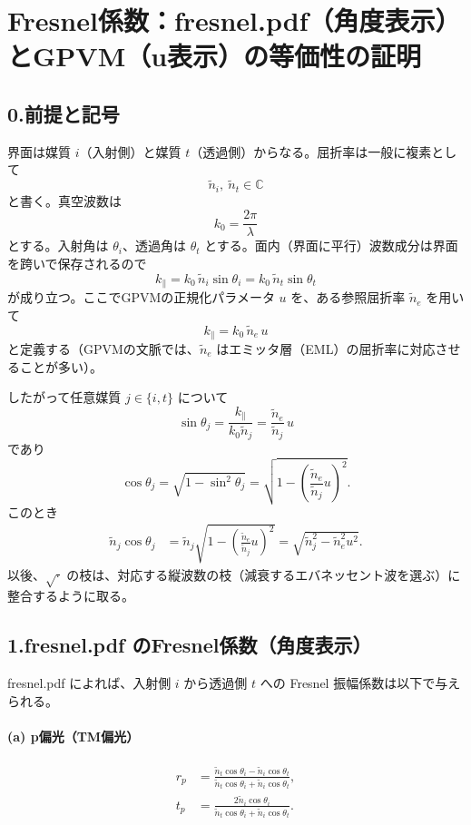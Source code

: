 
\section*{Fresnel係数：fresnel.pdf（角度表示）とGPVM（u表示）の等価性の証明}

\subsection*{0.\;前提と記号}
界面は媒質 $i$（入射側）と媒質 $t$（透過側）からなる。屈折率は一般に複素として
\[
\tilde n_i,\ \tilde n_t\in\mathbb{C}
\]
と書く。真空波数は
\[
k_0=\frac{2\pi}{\lambda}
\]
とする。入射角は $\theta_i$、透過角は $\theta_t$ とする。面内（界面に平行）波数成分は界面を跨いで保存されるので
\[
k_\parallel = k_0\,\tilde n_i \sin\theta_i = k_0\,\tilde n_t \sin\theta_t
\]
が成り立つ。ここでGPVMの正規化パラメータ $u$ を、ある参照屈折率 $\tilde n_e$ を用いて
\[
k_\parallel = k_0\,\tilde n_e\,u
\]
と定義する（GPVMの文脈では、$\tilde n_e$ はエミッタ層（EML）の屈折率に対応させることが多い）。

したがって任意媒質 $j\in\{i,t\}$ について
\[
\sin\theta_j=\frac{k_\parallel}{k_0\tilde n_j}=\frac{\tilde n_e}{\tilde n_j}\,u
\]
であり
\[
\cos\theta_j=\sqrt{1-\sin^2\theta_j}
=\sqrt{1-\left(\frac{\tilde n_e}{\tilde n_j}u\right)^2}.
\]
このとき
\begin{align}
\tilde n_j\cos\theta_j
&=\tilde n_j\sqrt{1-\left(\frac{\tilde n_e}{\tilde n_j}u\right)^2}
=\sqrt{\tilde n_j^2-\tilde n_e^2u^2}.
\label{eq:ncos_to_sqrt}
\end{align}
以後、$\sqrt{\cdot}$ の枝は、対応する縦波数の枝（減衰するエバネッセント波を選ぶ）に整合するように取る。

\subsection*{1.\;fresnel.pdf のFresnel係数（角度表示）}
fresnel.pdf によれば、入射側 $i$ から透過側 $t$ への Fresnel 振幅係数は以下で与えられる。

\paragraph{(a) p偏光（TM偏光）}
\begin{align}
r_p
&=\frac{\tilde n_t\cos\theta_i-\tilde n_i\cos\theta_t}
{\tilde n_t\cos\theta_i+\tilde n_i\cos\theta_t},
\label{eq:rp_angle}
\\
t_p
&=\frac{2\tilde n_i\cos\theta_i}
{\tilde n_t\cos\theta_i+\tilde n_i\cos\theta_t}.
\label{eq:tp_angle}
\end{align}

